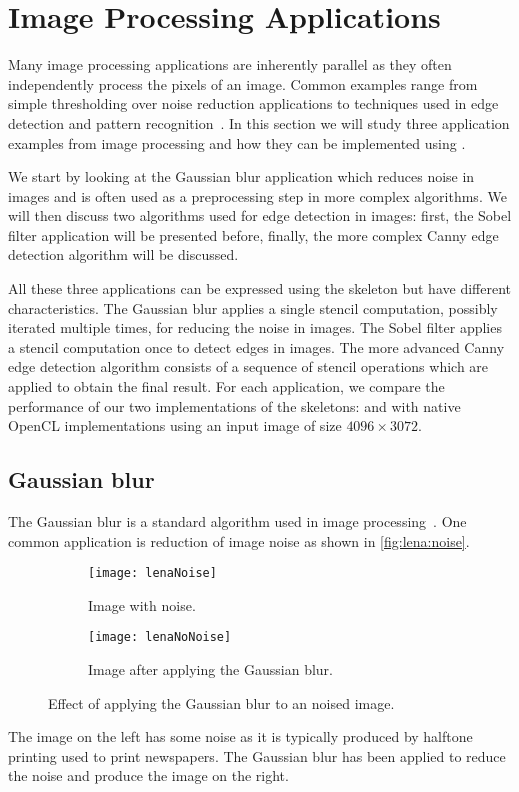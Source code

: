 \section{Image Processing Applications}
Many image processing applications are inherently parallel as they often independently process the pixels of an image.
Common examples range from simple thresholding over noise reduction applications to techniques used in edge detection and pattern recognition~\cite{Umbaugh1997}.
In this section we will study three application examples from image processing and how they can be implemented using \SkelCL.

We start by looking at the Gaussian blur application which reduces noise in images and is often used as a preprocessing step in more complex algorithms.
We will then discuss two algorithms used for edge detection in images:
first, the Sobel filter application will be presented before, finally, the more complex Canny edge detection algorithm will be discussed.

All these three applications can be expressed using the \stencil skeleton but have different characteristics.
The Gaussian blur applies a single stencil computation, possibly iterated multiple times, for reducing the noise in images.
The Sobel filter applies a stencil computation once to detect edges in images.
The more advanced Canny edge detection algorithm consists of a sequence of stencil operations which are applied to obtain the final result.
For each application, we compare the performance of our two implementations of the \stencil skeletons:  and  with native OpenCL implementations using an input image of size $4096 \times 3072$.










\subsection{Gaussian blur}
\label{sec:gauss}
The Gaussian blur is a standard algorithm used in image processing~\cite{Umbaugh1997}.
One common application is reduction of image noise as shown in \autoref{fig:lena:noise}.
%
\begin{figure}[tb]
  \centering
  \begin{subfigure}[t]{.45\textwidth}
    \texttt{[image: lenaNoise]}
    \caption{Image with noise.}
    \label{fig:lena:noise:yes}
  \end{subfigure}
  \hfill
  \begin{subfigure}[t]{.45\textwidth}
    \texttt{[image: lenaNoNoise]}
    \caption{Image after applying the Gaussian blur.}
    \label{fig:lena:noise:no}
  \end{subfigure}
  \caption{Effect of applying the Gaussian blur to an noised image.}
  \label{fig:lena:noise}
\end{figure}
%
The image on the left has some noise as it is typically produced by halftone printing used to print newspapers.
The Gaussian blur has been applied to reduce the noise and produce the image on the right.

